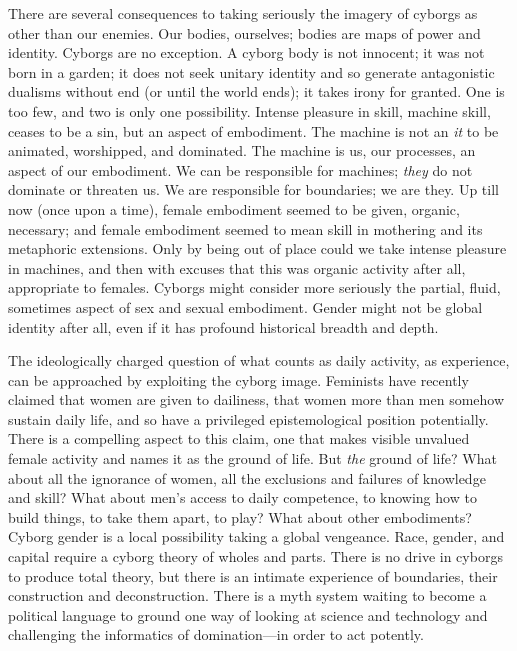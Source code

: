 \documentclass[DIV=12,%
               BCOR=10mm,%
               headinclude=false,%
               footinclude=false,open=any,%
               fontsize=11pt,%
               twoside,%
               paper=210mm:11in]%
               {scrbook}
\newcommand*{\hairline}{%
  \bigskip%
  \noindent \hrulefill%
  \bigskip%
}
\begin{document}
There are several consequences to taking seriously the imagery of cyborgs as other than our enemies. Our bodies, ourselves; bodies are maps of power and identity. Cyborgs are no exception. A cyborg body is not innocent; it was not born in a garden; it does not seek unitary identity and so generate antagonistic dualisms without end (or until the world ends); it takes irony for granted. One is too few, and two is only one possibility. Intense pleasure in skill, machine skill, ceases to be a sin, but an aspect of embodiment. The machine is not an \emph{it} to be animated, worshipped, and dominated. The machine is us, our processes, an aspect of our embodiment. We can be responsible for machines; \emph{they} do not dominate or threaten us. We are responsible for boundaries; we are they. Up till now (once upon a time), female embodiment seemed to be given, organic, necessary; and female embodiment seemed to mean skill in mothering and its metaphoric extensions. Only by being out of place could we take intense pleasure in machines, and then with excuses that this was organic activity after all, appropriate to females. Cyborgs might consider more seriously the partial, fluid, sometimes aspect of sex and sexual embodiment. Gender might not be global identity after all, even if it has profound historical breadth and depth.


The ideologically charged question of what counts as daily activity, as experience, can be approached by exploiting the cyborg image. Feminists have recently claimed that women are given to dailiness, that women more than men somehow sustain daily life, and so have a privileged epistemological position potentially. There is a compelling aspect to this claim, one that makes visible unvalued female activity and names it as the ground of life. But \emph{the} ground of life? What about all the ignorance of women, all the exclusions and failures of knowledge and skill? What about men’s access to daily competence, to knowing how to build things, to take them apart, to play? What about other embodiments? Cyborg gender is a local possibility taking a global vengeance. Race, gender, and capital require a cyborg theory of wholes and parts. There is no drive in cyborgs to produce total theory, but there is an intimate experience of boundaries, their construction and deconstruction. There is a myth system waiting to become a political language to ground one way of looking at science and technology and challenging the informatics of domination—in order to act potently.


\hairline
\end{document}
